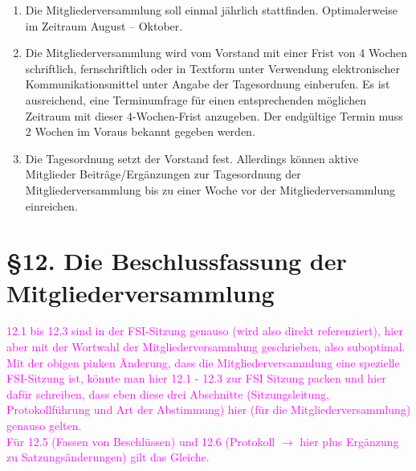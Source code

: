 \documentclass[a4paper,12pt]{article}
\begin{document}
\begin{enumerate}
    	\item
		Die Mitgliederversammlung soll einmal jährlich stattfinden.
		Optimalerweise im Zeitraum August – Oktober.
    	\item
		Die Mitgliederversammlung wird vom Vorstand mit einer Frist von
		4 Wochen schriftlich, fernschriftlich oder in Textform unter
		Verwendung elektronischer Kommunikationsmittel unter Angabe der
		Tagesordnung einberufen. Es ist ausreichend, eine Terminumfrage
		für einen entsprechenden möglichen Zeitraum mit dieser
		4-Wochen-Frist anzugeben. Der endgültige Termin muss 2
		Wochen im Voraus bekannt gegeben werden.
    	\item
		Die Tagesordnung setzt der Vorstand fest. Allerdings können
		aktive Mitglieder Beiträge/Ergänzungen zur Tagesordnung der
		Mitgliederversammlung bis zu einer Woche vor der
		Mitgliederversammlung einreichen.
\end{enumerate}

\section*{§12. Die Beschlussfassung der Mitgliederversammlung}

\textcolor{magenta}{12.1 bis 12.3 sind in der FSI-Sitzung genauso (wird also direkt referenziert), hier aber mit der Wortwahl der Mitgliederversammlung geschrieben, also suboptimal. Mit der obigen pinken Änderung, dass die Mitgliederversammlung eine spezielle FSI-Sitzung ist, könnte man hier 12.1 - 12.3 zur FSI Sitzung packen und hier dafür schreiben, dass eben diese drei Abschnitte (Sitzungsleitung, Protokollführung und  Art der Abstimmung) hier (für die Mitgliederversammlung) genauso gelten. \\
Für 12.5 (Fassen von Beschlüssen) und 12.6 (Protokoll $\rightarrow$ hier plus Ergänzung zu Satzungsänderungen) gilt das Gleiche.}
	
\end{document}

